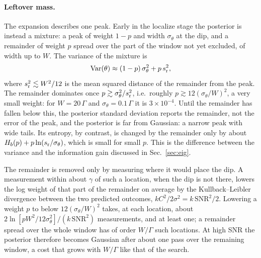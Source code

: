 \paragraph{Leftover mass.} The expansion describes one peak. Early in the localize stage the posterior is instead a mixture: a
peak of weight $1-p$ and width $\sigma_\theta$ at the dip, and a remainder of weight $p$ spread over the part of
the window not yet excluded, of width up to $W$. The variance of the mixture is
\begin{equation*}
  \mathrm{Var}(\theta)\approx(1-p)\,\sigma_\theta^2+p\,s_{\rm r}^2,
\end{equation*}
where $s_{\rm r}^2\lesssim W^2/12$ is the mean squared distance of the remainder from the peak. The remainder
dominates once $p\gtrsim\sigma_\theta^2/s_{\rm r}^2$, i.e.\ roughly $p\gtrsim12(\sigma_\theta/W)^2$, a very small
weight: for $W=20\,\Gamma$ and $\sigma_\theta=0.1\,\Gamma$ it is $3\times10^{-4}$. Until the remainder has fallen below
this, the posterior standard deviation reports the remainder, not the error of the peak, and the posterior is
far from Gaussian: a narrow peak with wide tails. Its entropy, by contrast, is changed by the remainder only by
about $H_b(p)+p\ln(s_{\rm r}/\sigma_\theta)$, which is small for small $p$. This is the difference between the
variance and the information gain discussed in Sec.~\ref{sec:eig}.

The remainder is removed only by measuring where it would place the dip. A measurement within about $\gamma$ of such
a location, when the dip is not there, lowers the log weight of that part of the remainder on average by the
Kullback--Leibler divergence between the two predicted outcomes, $kC^2/2\sigma^2=k\,\mathrm{SNR}^2/2$. Lowering a
weight $p$ to below $12(\sigma_\theta/W)^2$ takes, at each location, about
$2\ln[pW^2/12\sigma_\theta^2]/(k\,\mathrm{SNR}^2)$ measurements, and at least one; a remainder spread over the
whole window has of order $W/\Gamma$ such locations. At high SNR the posterior therefore becomes Gaussian after
about one pass over the remaining window, a cost that grows with $W/\Gamma$ like that of the search.
